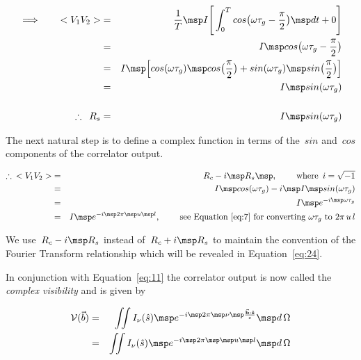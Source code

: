\begin{eqnarray}
  \label{eq:16}
  \implies \qquad <V_1V_2> &=& \frac{1}{T} \msp I \Bigg [\int _0^T cos \big ( \omega \tau _g - \frac{\pi }{2}\big ) \msp dt + 0 \Bigg ] \nonumber \\
                           &=& I \msp cos \big ( \omega \tau _g - \frac{\pi }{2}\big )\nonumber \\
                           &=& I \msp \Big [cos(\omega \tau _g) \msp cos \big ( \frac{\pi }{2}\big ) + sin(\omega \tau _g) \msp sin \big ( \frac{\pi }{2}\big ) \Big ] \nonumber \\
                           &=& I \msp sin(\omega \tau _g) \nonumber \\
                                                          \nonumber \\
   \therefore \enspace R_s &=& I \msp sin(\omega \tau _g) \nonumber
\end{eqnarray}

The next natural step is to define a complex function in terms of the~$sin$ and~$cos$ components of the correlator output.

\begin{eqnarray}
  \label{eq:17}
  \therefore \enspace <V_1V_2> &=& R_c - i \msp R_s \msp , \hspace{0.8cm} \mbox{where} \enspace i = \sqrt{-1} \nonumber \\
                               &=& I \msp cos(\omega \tau _g) - i \msp I \msp sin(\omega \tau _g) \nonumber \\
                               &=& I \msp e^{-i\msp \omega \tau _g} \nonumber \\
                               &=& I \msp e^{-i\msp 2\pi \msp u \msp l}, \hspace{0.8cm} \mbox{see Equation~\eqref{eq:7} for converting } \omega \tau _g \mbox{ to } 2\pi \, u \, l \nonumber
\end{eqnarray}

\begin{braced}
  We use~$R_c - i \msp R_s$ instead of~$R_c + i \msp R_s$ to maintain the convention of the Fourier Transform relationship which will be revealed in Equation~\eqref{eq:24}.
\end{braced}
\vspace{0.5cm}

In conjunction with Equation~\eqref{eq:11} the correlator output is now called the \emph{complex visibility} and is given by

\begin{eqnarray}
  \label{eq:21}
  \begin{aligned}
  \mathcal{V}(\vec{b}) &=& \iint I_\nu (\hat{s}) \msp e^{-i \msp 2\pi \msp \nu \msp \frac{\vec{\mathbf{b}} \boldsymbol{\cdot} \mathbf{\hat{s}}}{c}} \msp d\,\Omega \\
                       &=& \iint I_\nu (\hat{s}) \msp e^{-i \msp 2\pi \msp \msp u \msp l} \msp d\,\Omega
  \end{aligned}
\end{eqnarray}

